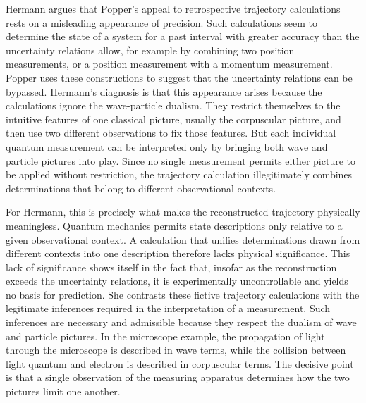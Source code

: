 
Hermann argues that Popper’s appeal to retrospective trajectory calculations rests on a misleading appearance of precision. Such calculations seem to determine the state of a system for a past interval with greater accuracy than the uncertainty relations allow, for example by combining two position measurements, or a position measurement with a momentum measurement. Popper uses these constructions to suggest that the uncertainty relations can be bypassed. Hermann’s diagnosis is that this appearance arises because the calculations ignore the wave-particle dualism. They restrict themselves to the intuitive features of one classical picture, usually the corpuscular picture, and then use two different observations to fix those features. But each individual quantum measurement can be interpreted only by bringing both wave and particle pictures into play. Since no single measurement permits either picture to be applied without restriction, the trajectory calculation illegitimately combines determinations that belong to different observational contexts.

For Hermann, this is precisely what makes the reconstructed trajectory physically meaningless. Quantum mechanics permits state descriptions only relative to a given observational context. A calculation that unifies determinations drawn from different contexts into one description therefore lacks physical significance. This lack of significance shows itself in the fact that, insofar as the reconstruction exceeds the uncertainty relations, it is experimentally uncontrollable and yields no basis for prediction. She contrasts these fictive trajectory calculations with the legitimate inferences required in the interpretation of a measurement. Such inferences are necessary and admissible because they respect the dualism of wave and particle pictures. In the microscope example, the propagation of light through the microscope is described in wave terms, while the collision between light quantum and electron is described in corpuscular terms. The decisive point is that a single observation of the measuring apparatus determines how the two pictures limit one another.

